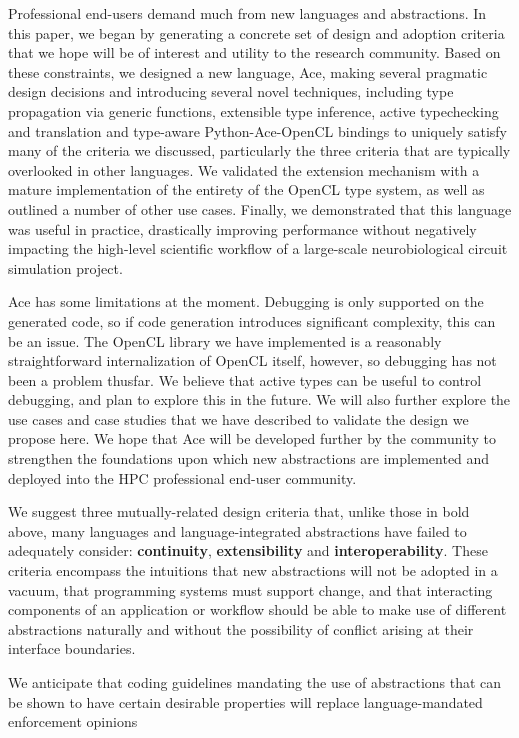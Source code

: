 \documentclass[9pt,preprint]{sigplanconf}
\begin{document}
Professional end-users demand much from new languages and abstractions. In this paper, we began by generating a concrete set of design and adoption criteria that we hope will be of interest and utility to the research community. Based on these constraints, we designed a new language, Ace, making several pragmatic design decisions and introducing several novel techniques, including type propagation via generic functions, extensible type inference, active typechecking and translation and type-aware Python-Ace-OpenCL bindings to uniquely satisfy many of the criteria we discussed, particularly the three criteria that are typically overlooked in other languages. We validated the extension mechanism with a mature implementation of  the entirety of the OpenCL type system, as well as outlined a number of other use cases. Finally, we demonstrated that this language was useful in practice, drastically improving performance without negatively impacting the high-level scientific workflow of a large-scale neurobiological circuit simulation project. 



Ace has some limitations at the moment. Debugging is only supported on the generated code, so if code generation introduces significant complexity, this can be an issue. The OpenCL library we have implemented is a reasonably straightforward internalization of OpenCL itself, however, so debugging has not been a problem thusfar. We believe that active types can be useful to control debugging, and plan to explore this in the future. We will also further explore the use cases and case studies that we have described to validate the design we propose here. We hope that Ace will be developed further by the community to strengthen the foundations upon which new abstractions are implemented and deployed into the HPC professional end-user community.

We suggest three mutually-related {design criteria} that, unlike those in bold above, many languages and language-integrated abstractions have failed to adequately consider: \textbf{continuity}, \textbf{extensibility} and \textbf{interoperability}. These criteria encompass the intuitions that new abstractions will not be adopted in a vacuum, that programming systems must  support change, and that interacting components of an application or workflow should be able to make use of different abstractions naturally and without the possibility of conflict arising at their interface boundaries.


 We anticipate that coding guidelines mandating the use of abstractions that can be shown to have certain desirable properties will replace language-mandated enforcement opinions 
 
\end{document}
